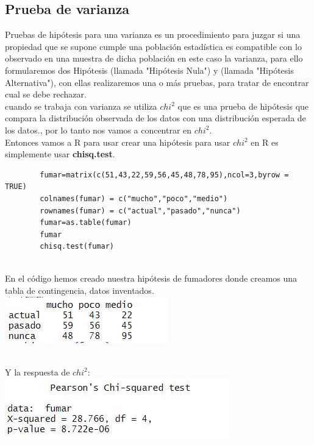 \documentclass[12pt,hidelinks]{article}
\begin{document}
        \subsection{Prueba de varianza}
        Pruebas de hipótesis para una varianza es un procedimiento para juzgar si una propiedad que se supone cumple una población estadística es compatible con lo observado en una muestra de dicha población en este caso la varianza, para ello formularemos dos Hipótesis (llamada "Hipótesis Nula") y (llamada "Hipótesis Alternativa"), con ellas realizaremos una o más pruebas, para tratar de encontrar cual se debe rechazar.
        \\ cuando se trabaja con varianza se utiliza $chi^2$ que es una prueba de hipótesis que compara la distribución observada de los datos con una distribución esperada de los datos., por lo tanto nos vamos a concentrar en $chi^2$.\\
        Entonces vamos a R para usar crear una hipótesis para usar $chi^2$ en R es simplemente usar \textbf{chisq.test}.\\
        \begin{lstlisting}
        fumar=matrix(c(51,43,22,59,56,45,48,78,95),ncol=3,byrow = TRUE)
        colnames(fumar) = c("mucho","poco","medio")
        rownames(fumar) = c("actual","pasado","nunca")
        fumar=as.table(fumar)
        fumar
        chisq.test(fumar)
        \end{lstlisting}\\
        En el código hemos creado nuestra hipótesis de fumadores donde creamos una tabla de contingencia, datos inventados.\\
            \centering
            \includegraphics[scale=0.8]{chi.JPG}\\
            \centering
            \caption{}\\
        Y la respuesta de $chi^2$:\\
            \centering
            \includegraphics[scale=0.8]{chires.JPG}\\
            \centering
            \caption{}\\
\end{document}
